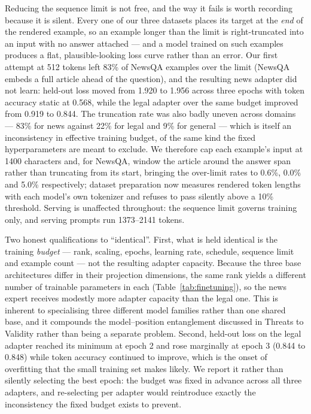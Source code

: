 \documentclass[journal,10pt,compsoc,onecolumn]{IEEEtran}
\begin{document}
Reducing the sequence limit is not free, and the way it fails is worth recording
because it is silent. Every one of our three datasets places its target at the
\emph{end} of the rendered example, so an example longer than the limit is
right-truncated into an input with no answer attached --- and a model trained on
such examples produces a flat, plausible-looking loss curve rather than an error.
Our first attempt at 512 tokens left 83\% of NewsQA examples over the limit
(NewsQA embeds a full article ahead of the question), and the resulting news
adapter did not learn: held-out loss moved from 1.920 to 1.956 across three
epochs with token accuracy static at 0.568, while the legal adapter over the same
budget improved from 0.919 to 0.844. The truncation rate was also badly uneven
across domains --- 83\% for news against 22\% for legal and 9\% for general ---
which is itself an inconsistency in effective training budget, of the same kind
the fixed hyperparameters are meant to exclude. We therefore cap each example's
input at 1400 characters and, for NewsQA, window the article around the answer
span rather than truncating from its start, bringing the over-limit rates to
0.6\%, 0.0\% and 5.0\% respectively; dataset preparation now measures rendered
token lengths with each model's own tokenizer and refuses to pass silently above a
10\% threshold. Serving is unaffected throughout: the sequence limit governs
training only, and serving prompts run 1373--2141 tokens.

Two honest qualifications to ``identical''. First, what is held identical is the
training \emph{budget} --- rank, scaling, epochs, learning rate, schedule,
sequence limit and example count --- not the resulting adapter capacity. Because
the three base architectures differ in their projection dimensions, the same rank
yields a different number of trainable parameters in each
(Table~\ref{tab:finetuning}), so the news expert receives modestly more adapter
capacity than the legal one. This is inherent to specialising three different
model families rather than one shared base, and it compounds the
model--position entanglement discussed in Threats to Validity rather than being a
separate problem. Second, held-out loss on the legal adapter reached its minimum
at epoch 2 and rose marginally at epoch 3 (0.844 to 0.848) while token accuracy
continued to improve, which is the onset of overfitting that the small training
set makes likely. We report it rather than silently selecting the best epoch: the
budget was fixed in advance across all three adapters, and re-selecting per
adapter would reintroduce exactly the inconsistency the fixed budget exists to
prevent.
\end{document}
